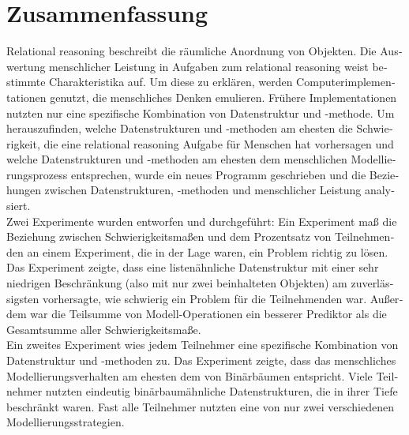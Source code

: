 \documentclass[hidelinks]{scrartcl}
\begin{document}
\section*{Zusammenfassung}
\begin{otherlanguage}{ngerman}
Relational reasoning beschreibt die räumliche Anordnung von Objekten. Die Auswertung menschlicher Leistung in Aufgaben zum relational reasoning weist bestimmte Charakteristika auf. Um diese zu erklären, werden Computerimplementationen genutzt, die menschliches Denken emulieren. Frühere Implementationen nutzten nur eine spezifische Kombination von Datenstruktur und -methode. Um herauszufinden, welche Datenstrukturen und -methoden am ehesten die Schwierigkeit, die eine relational reasoning Aufgabe für Menschen hat vorhersagen und welche Datenstrukturen und -methoden am ehesten dem menschlichen Modellierungsprozess entsprechen, wurde ein neues Programm geschrieben und die Beziehungen zwischen Datenstrukturen, -methoden und menschlicher Leistung analysiert. \\
Zwei Experimente wurden entworfen und durchgeführt: Ein Experiment maß die Beziehung zwischen Schwierigkeitsmaßen und dem Prozentsatz von Teilnehmenden an einem Experiment, die in der Lage waren, ein Problem richtig zu lösen. Das Experiment zeigte, dass eine listenähnliche Datenstruktur mit einer sehr niedrigen Beschränkung (also mit nur zwei beinhalteten Objekten) am zuverlässigsten vorhersagte, wie schwierig ein Problem für die Teilnehmenden war. Außerdem war die Teilsumme von Modell-Operationen ein besserer Prediktor als die Gesamtsumme aller Schwierigkeitsmaße. \\
Ein zweites Experiment wies jedem Teilnehmer eine spezifische Kombination von Datenstruktur und -methoden zu. Das Experiment zeigte, dass das menschliches Modellierungsverhalten am ehesten dem von Binärbäumen entspricht. Viele Teilnehmer nutzten eindeutig binärbaumähnliche Datenstrukturen, die in ihrer Tiefe beschränkt waren. Fast alle Teilnehmer nutzten eine von nur zwei verschiedenen Modellierungsstrategien.
\end{otherlanguage}

\newpage
\tableofcontents

\newpage
\end{document}
